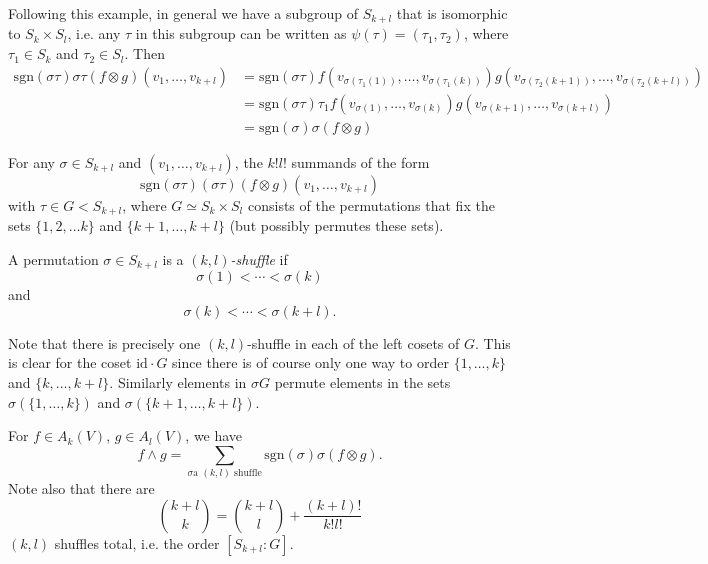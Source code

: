 \begin{xmpl}
\begin{enumerate}
{      Following this example, in general we have a subgroup of
      $S_{k+l}$ that is isomorphic to $S_k \times S_l$, i.e.
      any $\tau$ in this subgroup can be written as
      $\psi(\tau) = (\tau_1, \tau_2)$, where $\tau_1 \in S_k$ and
      $\tau_2 \in S_l$. Then
      \begin{align*}
         \mathrm{sgn}(\sigma \tau)
         \sigma \tau (f \otimes g)
         (v_1, \dots, v_{k +l})
      &= \mathrm{sgn}(\sigma \tau)
         f(v_{\sigma(\tau_1(1))}, \dots, v_{\sigma(\tau_1(k))})
         g(v_{\sigma(\tau_2(k+1))}, \dots, v_{\sigma(\tau_2(k+l))}) \\
      &= \mathrm{sgn}(\sigma \tau)
         \tau_1
           f(v_{\sigma(1)}, \dots, v_{\sigma(k)})
           g(v_{\sigma(k+1)}, \dots, v_{\sigma(k+l)}) \\
      &= \mathrm{sgn}(\sigma)
          \sigma (f \otimes g)
      \end{align*}
    }
  \end{enumerate}

  For any $\sigma \in S_{k + l}$ and $(v_1, \dots, v_{k+l})$, the
  $k!l!$ summands of the form
  $$
  \mathrm{sgn}(\sigma \tau)
  (\sigma \tau)(f \otimes g)(v_1, \dots, v_{k+l})
  $$
  with $\tau \in G < S_{k + l}$, where
  $G \simeq S_k \times S_l$ consists of the permutations that fix
  the sets $\{1, 2, \dots k\}$ and $\{ k + 1, \dots, k + l \}$ (but
  possibly permutes these sets).
\end{xmpl}

\begin{defn}
A permutation $\sigma \in S_{k+l}$ is a \emph{$(k, l)$-shuffle} if
$$
\sigma(1) < \cdots < \sigma(k)
$$
and
$$
\sigma(k) < \cdots < \sigma(k + l).
$$
\end{defn}
Note that there is precisely one $(k, l)$-shuffle in each of the left
cosets of $G$. This is clear for the coset
$\mathrm{id} \cdot G$ since there is of course only one way to order
$\{ 1, \dots, k \}$ and $\{ k, \dots, k + l \}$. Similarly elements in
$\sigma G$ permute elements in the sets $\sigma(\{ 1, \dots, k \})$
and $\sigma( \{ k + 1, \dots, k + l \})$.

\begin{prop}
For $f \in A_k(V)$, $g \in A_l(V)$, we have
$$
  f \wedge g
= \sum_{\sigma \text{a $(k, l)$ shuffle}}
    \mathrm{sgn}(\sigma)
    \sigma(f \otimes g).
$$
Note also that there are
$$
  { k + l \choose k }
= { k + l \choose l }
+ \frac{(k + l)!}{k! l!}
$$
$(k, l)$ shuffles total, i.e. the order $[S_{k + l} : G]$.
\end{prop}

